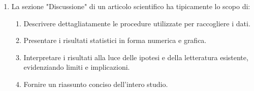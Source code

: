 \documentclass[12pt, a4paper]{article}
\begin{document}
\begin{enumerate}[resume]
    \item La sezione "Discussione" di un articolo scientifico ha tipicamente lo scopo di:
    \begin{enumerate}
        \item Descrivere dettagliatamente le procedure utilizzate per raccogliere i dati.
        \item Presentare i risultati statistici in forma numerica e grafica.
        \item Interpretare i risultati alla luce delle ipotesi e della letteratura esistente, evidenziando limiti e implicazioni.
        \item Fornire un riassunto conciso dell'intero studio.
    \end{enumerate}
    \vspace{0.3cm}
\end{enumerate}

\end{document}
